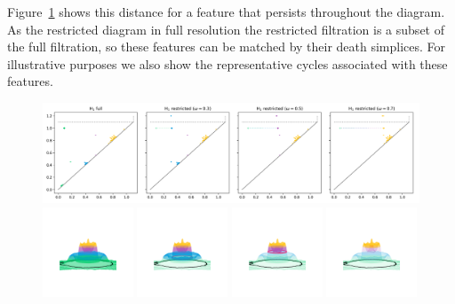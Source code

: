 Figure~\ref{fig:restricted} shows this distance for a feature that persists throughout the diagram.
As the restricted diagram in full resolution the restricted filtration is a subset of the full filtration, so these features can be matched by their death simplices.
For illustrative purposes we also show the representative cycles associated with these features.


\begin{figure}[htbp]\label{fig:restricted}
  \centering
  \includegraphics[trim=0 0 -10 0, clip, width=\textwidth]{scripts/figures/matching2/dgm-1.png}
  \includegraphics[trim=500 800 500 800, clip, width=0.24\textwidth]{scripts/figures/matching2/surf_side-1.png}
  \includegraphics[trim=500 800 500 800, clip, width=0.24\textwidth]{scripts/figures/matching2/surf_side-1_0.png}
  \includegraphics[trim=500 800 500 800, clip, width=0.24\textwidth]{scripts/figures/matching2/surf_side-1_1.png}
  \includegraphics[trim=500 800 500 800, clip, width=0.24\textwidth]{scripts/figures/matching2/surf_side-1_2.png}

\end{figure}
